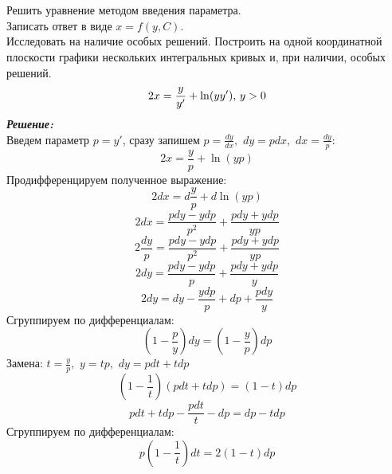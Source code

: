 \documentclass[a5paper, 10pt]{article}
\theoremstyle{definition}
\theoremstyle{plain}
\theoremstyle{remark}
\begin{document}
\newpage
\section{}
Решить уравнение методом введения параметра. \\
Записать ответ в виде $x = f(y, C)$.\\
Исследовать на наличие особых решений. Построить на одной координатной плоскости графики нескольких интегральных кривых и, при наличии, особых решений.
\begin{equation*}
2x = \frac{y}{y'} + \ln (yy'), \, y >0\\
\end{equation*}
\textit{\textbf{Решение:}}\\
Введем параметр $p = y'$, сразу запишем $p = \frac{dy}{dx}, \, \, dy = pdx, \, \, dx = \frac{dy}{p}$:
\begin{equation*}
2x = \frac{y}{p} + \ln (yp)
\end{equation*}
Продифференцируем полученное выражение:
\begin{equation*}
2dx = d\frac{y}{p} + d\ln (yp)
\end{equation*}
\begin{equation*}
2dx = \frac{pdy - ydp}{p^2} + \frac{pdy + ydp}{yp}
\end{equation*}
\begin{equation*}
2\frac{dy}{p} = \frac{pdy - ydp}{p^2} + \frac{pdy + ydp}{yp}
\end{equation*}
\begin{equation*}
2dy = \frac{pdy - ydp}{p} + \frac{pdy + ydp}{y}
\end{equation*}
\begin{equation*}
2dy =dy - \frac{ydp}{p} + dp +\frac{pdy}{y}
\end{equation*}
Сгруппируем по дифференциалам:
\begin{equation*}
\left( 1 - \frac{p}{y} \right) dy = \left(1 - \frac{y}{p} \right) dp
\end{equation*}
Замена: $t = \frac{y}{p}, \, \, y = tp, \, \, dy = pdt + tdp$
\begin{equation*}
\left( 1 - \frac{1}{t} \right) ( pdt + tdp) = \left(1 - t \right) dp
\end{equation*}
\begin{equation*}
 pdt + tdp - \frac{ pdt}{t}  - dp = dp  - t dp
\end{equation*}
Сгруппируем по дифференциалам:
\begin{equation*}
 p \left(1  - \frac{ 1}{t} \right) dt  = 2 (1  - t) dp
\end{equation*}
\end{document}
